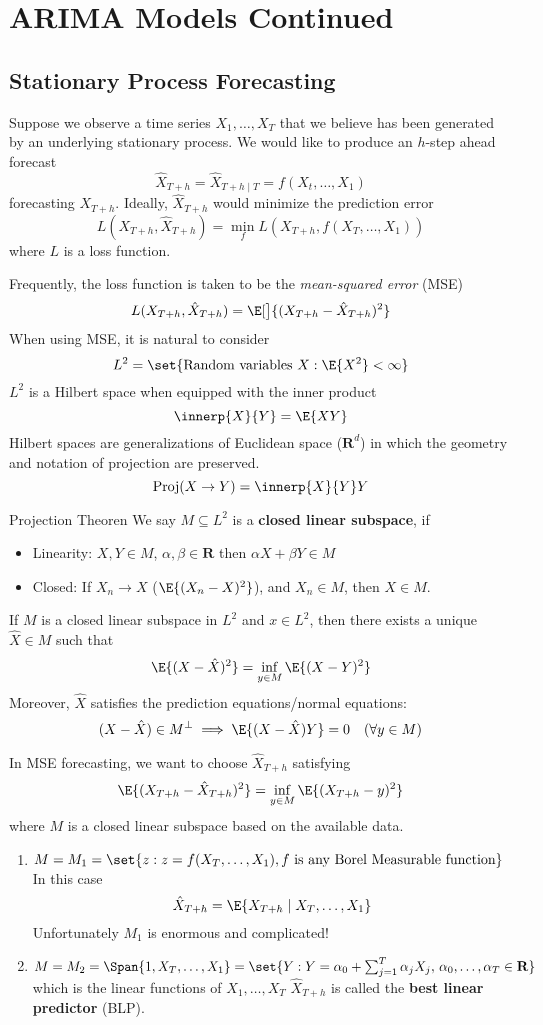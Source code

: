\chapter{ARIMA Models Continued}
\section{Stationary Process Forecasting}
Suppose we observe a time series
$ X_1,\ldots,X_T $
that we believe has been generated by an underlying
stationary process. We would like to
produce an $ h $-step ahead
forecast
\[ \hat{X}_{T+h}=\hat{X}_{T+h\mid T}=f(X_t,\ldots,X_1) \]
forecasting $ X_{T+h} $. Ideally, $ \hat{X}_{T+h} $
would minimize the prediction error
\[ L(X_{T+h},\hat{X}_{T+h})=\min_f
    L(X_{T+h},f(X_{T},\ldots,X_1)) \]
where $ L $ is a loss function.

Frequently, the loss function is taken
to be the \emph{mean-squared error} (MSE)
\[ L(X_{T+h},\hat{X}_{T+h})=
    \E[\big]{(X_{T+h}-\hat{X}_{T+h})^2} \]
When using MSE, it is natural to consider
\[ L^2=\set{\text{Random variables } X: \E{X^2}<\infty} \]
$ L^2 $ is a Hilbert space when equipped
with the inner product
\[ \innerp{X}{Y}=\E{XY} \]
Hilbert spaces are generalizations of Euclidean space ($ \mathbf{R}^d $)
in which the geometry and notation of projection
are preserved.
\[ \text{Proj}(X\to Y)=\innerp{X}{Y}Y \]
\begin{Theorem}{Projection Theoren}{}
    We say $ M\subseteq L^2 $
    is a \textbf{closed linear subspace}, if
    \begin{itemize}
        \item Linearity: $ X,Y\in M $, $ \alpha,\beta\in\mathbf{R} $
              then $ \alpha X+\beta Y\in M $
        \item Closed: If $ X_n\to X $ ($ \E{(X_n-X)^2} $),
              and $ X_n\in M $, then $ X\in M $.
    \end{itemize}
    If $ M $ is a closed linear subspace in $ L^2 $
    and $ x\in L^2 $, then there exists a
    unique $ \hat{X}\in M $ such that
    \[ \E{(X-\hat{X})^2}=\inf_{y\in M}\E{(X-Y)^2} \]
    Moreover, $ \hat{X} $ satisfies the prediction equations/normal
    equations:
    \[ (X-\hat{X})\in M^\perp \implies \E{(X-\hat{X})Y}=0\quad (\forall y\in M) \]
\end{Theorem}
In MSE forecasting, we want to choose
$ \hat{X}_{T+h} $ satisfying
\[ \E{(X_{T+h}-\hat{X}_{T+h})^2}=\inf_{y\in M}\E{(X_{T+h}-y)^2} \]
where $ M $ is a closed linear subspace based on the available
data.
\begin{enumerate}[(1)]
    \item $ M=M_1=\set{z:z=f(X_{T},\ldots,X_{1}), f\text{ is any
                  Borel Measurable function}} $
          In this case
          \[ \hat{X}_{T+h}=\E{X_{T+h}\mid X_{T},\ldots,X_1} \]
          Unfortunately $ M_1 $ is enormous and complicated!
    \item $ M=M_2=\Span{1,X_{T},\ldots,X_1}=
              \set{Y:Y=\alpha_0+\sum_{j=1}^{T} \alpha_j X_j,\,\alpha_0,\ldots,\alpha_T\in\mathbf{R}} $
          which is the linear functions of $ X_1,\ldots,X_T $
          $ \hat{X}_{T+h} $ is called the \textbf{best linear predictor} (BLP).
\end{enumerate}
